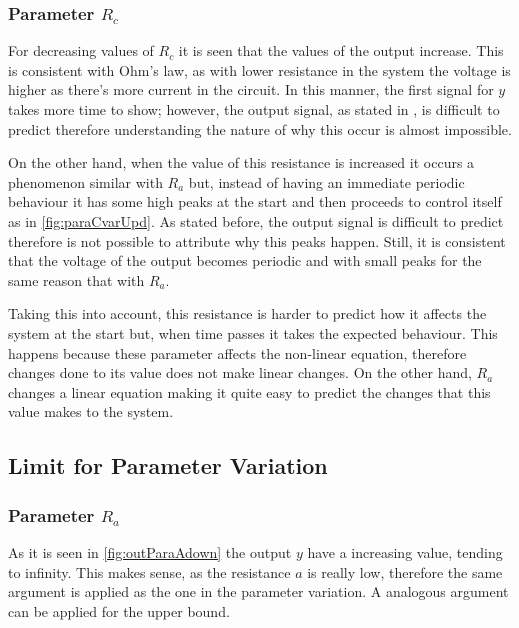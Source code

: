 \subsubsection{Parameter \texorpdfstring{$R_c$}{Rc}}
For decreasing values of $R_c$ it is seen that the values of the output increase. This is consistent with Ohm's law, as with lower resistance in the system the voltage is higher as there's more current in the circuit. In this manner, the first signal for $y$ takes more time to show; however, the output signal, as stated in \cite{canals2014random}, is difficult to predict therefore understanding the nature of why this occur is almost impossible.

On the other hand, when the value of this resistance is increased it occurs a phenomenon similar with $R_a$ but, instead of having an immediate periodic behaviour it has some high peaks at the start and then proceeds to control itself as in \ref{fig:paraCvarUpd}. As stated before, the output signal is difficult to predict therefore is not possible to attribute why this peaks happen. Still, it is consistent that the voltage of the output becomes periodic and with small peaks for the same reason that with $R_a$.

Taking this into account, this resistance is harder to predict how it affects the system at the start but, when time passes it takes the expected behaviour. This happens because these parameter affects the non-linear equation, therefore changes done to its value does not make linear changes. On the other hand, $R_a$ changes a linear equation making it quite easy to predict the changes that this value makes to the system.


\subsection{Limit for Parameter Variation}

\subsubsection{Parameter \texorpdfstring{$R_a$}{Ra}}
As it is seen in \ref{fig:outParaAdown} the output $y$ have a increasing value, tending to infinity. This makes sense, as the resistance $a$ is really low, therefore the same argument is applied as the one in the parameter variation. A analogous argument can be applied for the upper bound. 

